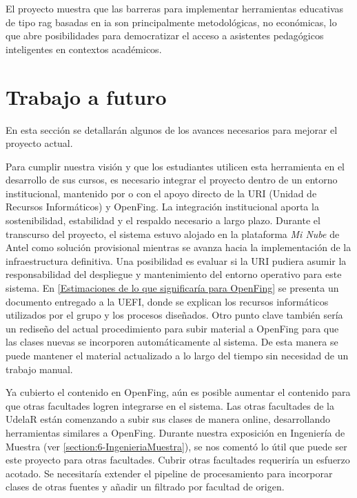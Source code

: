 El proyecto muestra que las barreras para implementar herramientas educativas de tipo \acrshort{rag} basadas en \acrshort{ia} son principalmente metodológicas, no económicas, lo que abre posibilidades para democratizar el acceso a asistentes pedagógicos inteligentes en contextos académicos.

\section{Trabajo a futuro}
\label{chapter:7-Trabajo a futuro}
En esta sección se detallarán algunos de los avances necesarios para mejorar el proyecto actual. 

Para cumplir nuestra visión y que los estudiantes utilicen esta herramienta en el desarrollo de sus cursos, es necesario integrar el proyecto dentro de un entorno institucional, mantenido por o con el apoyo directo de la URI (Unidad de Recursos Informáticos) y OpenFing. La integración institucional aporta la sostenibilidad, estabilidad y el respaldo necesario a largo plazo. Durante el transcurso del proyecto, el sistema estuvo alojado en la plataforma \textit{Mi Nube} de Antel como solución provisional mientras se avanza hacia la implementación de la infraestructura definitiva. Una posibilidad es evaluar si la URI pudiera asumir la responsabilidad del despliegue y mantenimiento del entorno operativo para este sistema. En \autoref{Estimaciones de lo que significaría para OpenFing} se presenta un documento entregado a la UEFI, donde se explican los recursos informáticos utilizados por el grupo y los procesos diseñados. Otro punto clave también sería un rediseño del actual procedimiento para subir material a OpenFing para que las clases nuevas se incorporen automáticamente al sistema. De esta manera se puede mantener el material actualizado a lo largo del tiempo sin necesidad de un trabajo manual. 

Ya cubierto el contenido en OpenFing, aún es posible aumentar el contenido para que otras facultades logren integrarse en el sistema. Las otras facultades de la UdelaR están comenzando a subir sus clases de manera online, desarrollando herramientas similares a OpenFing. Durante nuestra exposición en Ingeniería de Muestra (ver \autoref{section:6-IngenieriaMuestra}), se nos comentó lo útil que puede ser este proyecto para otras facultades. Cubrir otras facultades requeriría un esfuerzo acotado. Se necesitaría extender el pipeline de procesamiento para incorporar clases de otras fuentes y añadir un filtrado por facultad de origen.


